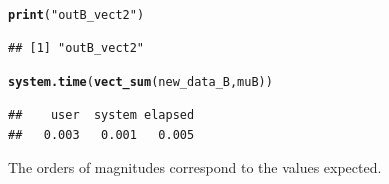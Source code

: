 \documentclass{llncs}\usepackage[]{graphicx}\usepackage[]{color}
\makeatletter
\newcommand{\hlstr}[1]{\textcolor[rgb]{0.192,0.494,0.8}{#1}}%
\newcommand{\hlstd}[1]{\textcolor[rgb]{0.345,0.345,0.345}{#1}}%
\newcommand{\hlkwd}[1]{\textcolor[rgb]{0.737,0.353,0.396}{\textbf{#1}}}%
\newenvironment{kframe}{%
 \def\at@end@of@kframe{}%
 \ifinner\ifhmode%
  \def\at@end@of@kframe{\end{minipage}}%
  \begin{minipage}{\columnwidth}%
 \fi\fi%
 \def\FrameCommand##1{\hskip\@totalleftmargin \hskip-\fboxsep
 \colorbox{shadecolor}{##1}\hskip-\fboxsep
     \hskip-\linewidth \hskip-\@totalleftmargin \hskip\columnwidth}%
 \MakeFramed {\advance\hsize-\width
   \@totalleftmargin\z@ \linewidth\hsize
   \@setminipage}}%
 {\par\unskip\endMakeFramed%
 \at@end@of@kframe}
\newenvironment{knitrout}{}{} %
\makeatother
\begin{document}
\begin{knitrout}
\begin{kframe}
\begin{alltt}
\hlkwd{print}\hlstd{(}\hlstr{"outB_vect2"}\hlstd{)}
\end{alltt}
\begin{lstlisting}[basicstyle=\ttfamily,breaklines=true]
## [1] "outB_vect2"
\end{lstlisting}
\begin{alltt}
\hlkwd{system.time}\hlstd{(}\hlkwd{vect_sum}\hlstd{(new_data_B,muB))}
\end{alltt}
\begin{lstlisting}[basicstyle=\ttfamily,breaklines=true]
##    user  system elapsed 
##   0.003   0.001   0.005
\end{lstlisting}
\end{kframe}
\end{knitrout}

\noindent
The orders of magnitudes correspond to the values expected.


\end{document}
